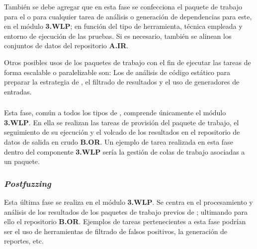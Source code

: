 \documentclass[10pt,conference,a4paper]{IEEEtran}
\begin{document}
También se debe agregar que en esta fase se confecciona el paquete de trabajo para el {\fz} o para cualquier tarea de análisis o generación de dependencias para este, en el módulo \textbf{3.WLP}; en función del tipo de herramienta, técnica empleada y entorno de ejecución de las pruebas. Si es necesario, también se alinean los conjuntos de datos del repositorio \textbf{A.IR}.

Otros posibles usos de los paquetes de trabajo con el fin de ejecutar las tareas de forma escalable o paralelizable son: Los de análisis de código estático para preparar la estrategia de {\fz}, el filtrado de resultados y el uso de generadores de entradas.


\subsubsection{{\fz}}
\label{Fase_fuzzing}

Esta fase, común a todos los tipos de {\fz}, comprende únicamente el módulo \textbf{3.WLP}. En ella se realizan las tareas de provisión del paquete de trabajo, el seguimiento de su ejecución y el volcado de los resultados en el repositorio de datos de salida en crudo \textbf{{B.OR}}. Un ejemplo de tarea realizada en esta fase dentro del componente \textbf{3.WLP} sería la gestión de colas de trabajo asociadas a un paquete.

\subsubsection{\textit{Postfuzzing}}
\label{Fase_postfuzzing}

Esta última fase se realiza en el módulo \textbf{3.WLP}. Se centra en el procesamiento y análisis de los resultados de los paquetes de trabajo previos de {\fz}; ultimando para ello el repositorio \textbf{B.OR}. Ejemplos de tareas pertenecientes a esta fase podrían ser el uso de herramientas de filtrado de falsos positivos, la generación de reportes, etc.
\end{document}
